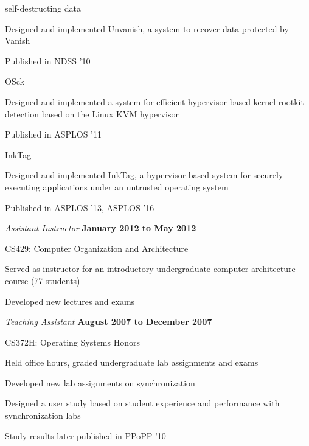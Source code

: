 \begin{outerlist}
\begin{innerlist}
\begin{innerlist}
self-destructing data
           \item Designed and implemented Unvanish, a system to recover
data protected by Vanish
           \item Published in NDSS '10
         \end{innerlist}
         \item OSck
         \begin{innerlist}
            \item Designed and implemented a system for efficient
hypervisor-based kernel rootkit detection based on the Linux KVM hypervisor
            \item Published in ASPLOS '11
         \end{innerlist}
         \item InkTag
         \begin{innerlist}
            \item Designed and implemented InkTag, a hypervisor-based system
for securely executing applications under an untrusted operating system
            \item Published in ASPLOS '13, ASPLOS '16
         \end{innerlist}
    \end{innerlist}
\item[] \textit{Assistant Instructor}%
        \hfill \textbf{January 2012 to May 2012}
        \begin{innerlist}
           \item CS429: Computer Organization and Architecture
           \begin{innerlist}
              \item Served as instructor for an introductory undergraduate
computer architecture course (77 students)
              \item Developed new lectures and exams
           \end{innerlist}
        \end{innerlist}
\item[] \textit{Teaching Assistant}%
        \hfill \textbf{August 2007 to December 2007}
        \begin{innerlist}
           \item CS372H: Operating Systems Honors
           \begin{innerlist}
              \item Held office hours, graded undergraduate lab assignments and exams
              \item Developed new lab assignments on synchronization
              \item Designed a user study based on student experience and
performance with synchronization labs
              \item Study results later published in PPoPP '10
           \end{innerlist}
        \end{innerlist}
\end{outerlist}

